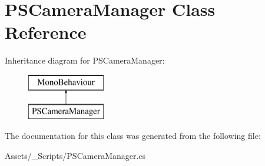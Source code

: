 \hypertarget{class_p_s_camera_manager}{}\section{P\+S\+Camera\+Manager Class Reference}
\label{class_p_s_camera_manager}
Inheritance diagram for P\+S\+Camera\+Manager\+:\begin{figure}[H]
\begin{center}
\leavevmode
\includegraphics[height=2.000000cm]{class_p_s_camera_manager}
\end{center}
\end{figure}


The documentation for this class was generated from the following file\+:\begin{DoxyCompactItemize}
\item 
Assets/\+\_\+\+Scripts/P\+S\+Camera\+Manager.\+cs\end{DoxyCompactItemize}

